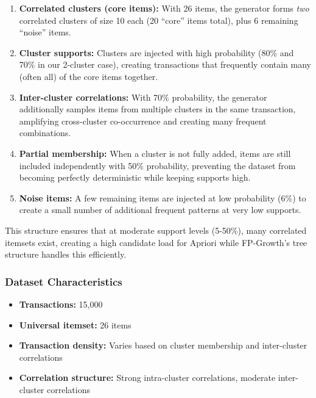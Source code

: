 \documentclass[11pt]{article}
\begin{document}
\begin{enumerate}
    \item \textbf{Correlated clusters (core items):} With 26 items, the generator forms \emph{two} correlated clusters of size 10 each (20 ``core'' items total), plus 6 remaining ``noise'' items.
    
    \item \textbf{Cluster supports:} Clusters are injected with high probability (80\% and 70\% in our 2-cluster case), creating transactions that frequently contain many (often all) of the core items together.
    
    \item \textbf{Inter-cluster correlations:} With 70\% probability, the generator additionally samples items from multiple clusters in the same transaction, amplifying cross-cluster co-occurrence and creating many frequent combinations.
    
    \item \textbf{Partial membership:} When a cluster is not fully added, items are still included independently with 50\% probability, preventing the dataset from becoming perfectly deterministic while keeping supports high.
    
    \item \textbf{Noise items:} A few remaining items are injected at low probability (6\%) to create a small number of additional frequent patterns at very low supports.
\end{enumerate}

This structure ensures that at moderate support levels (5-50\%), many correlated itemsets exist, creating a high candidate load for Apriori while FP-Growth's tree structure handles this efficiently.

\subsubsection{Dataset Characteristics}

\begin{itemize}
    \item \textbf{Transactions:} 15,000
    \item \textbf{Universal itemset:} 26 items
    \item \textbf{Transaction density:} Varies based on cluster membership and inter-cluster correlations
    \item \textbf{Correlation structure:} Strong intra-cluster correlations, moderate inter-cluster correlations
\end{itemize}
\end{document}
